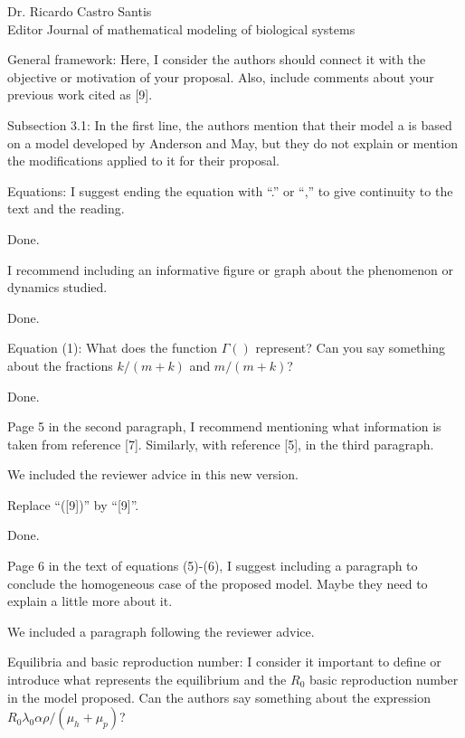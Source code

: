 \documentclass [12pt]{letter}
\begin{document}
\begin{letter}{Dr. Ricardo Castro Santis\\ Editor Journal of mathematical modeling of biological systems}
\begin{enumerate}
	{\color{red}
	\item General framework: Here, I consider the authors should connect it with the
	objective or motivation of your proposal. Also, include comments about your
	previous work cited as [9].
	}	
	
	
	{\color{red}
	\item Subsection 3.1: In the first line, the authors mention that their model a is based on
	a model developed by Anderson and May, but they do not explain or mention the
	modifications applied to it for their proposal.
	}

	\item Equations: I suggest ending the equation with “.” or “,” to give continuity to the text
	and the reading.
	
	Done.
	
	\item I recommend including an informative figure or graph about the phenomenon or
	dynamics studied.
	
	Done.
	
	\item Equation (1): What does the function $\Gamma()$ represent? Can you say something about
	the fractions $k/(m+k)$ and $m/(m+k)$?
	
	Done.
	
	\item Page 5 in the second paragraph, I recommend mentioning what information is
	taken from reference [7]. Similarly, with reference [5], in the third paragraph.
	
	We included the reviewer advice in this new version.
	
	\item Replace “([9])” by “[9]”.
	
	Done.
	
	\item Page 6 in the text of equations (5)-(6), I suggest including a paragraph to conclude
	the homogeneous case of the proposed model. Maybe they need to explain a little
	more about it.
	
	We included a paragraph following the reviewer advice.
	
	\item Equilibria and basic reproduction number: I consider it important to define or
	introduce what represents the equilibrium and the $R_0$ basic reproduction number in
	the model proposed. Can the authors say something about the expression
	$R_0 \lambda_0 \alpha \rho /(\mu_h + \mu_p)$?
	

\end{enumerate}
\end{letter}
\end{document}
